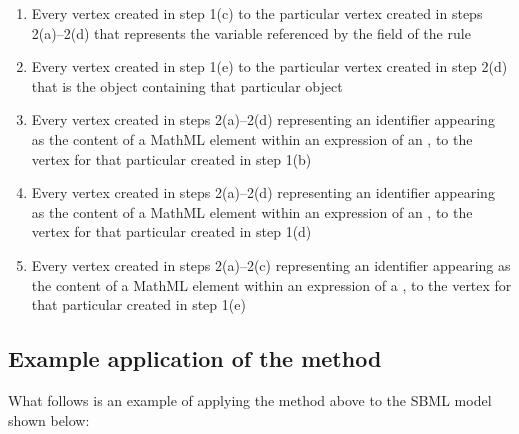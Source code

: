 \begin{enumerate}
\begin{enumerate}
  \item Every vertex created in step 1(c) to the particular vertex
    created in steps 2(a)--2(d) that represents the variable
    referenced by the  field of the rule
    
  \item Every vertex created in step 1(e) to the particular vertex
    created in step 2(d) that is the \Reaction object containing
    that particular \KineticLaw object
    
  \item Every vertex created in steps 2(a)--2(d) representing an
    identifier appearing as the content of a MathML 
    element within an expression of an \AssignmentRule, to the
    vertex for that particular \AssignmentRule created in step 1(b)
    
  \item Every vertex created in steps 2(a)--2(d) representing an
    identifier appearing as the content of a MathML 
    element within an expression of an \AlgebraicRule, to the
    vertex for that particular \AlgebraicRule created in step 1(d)
    
  \item Every vertex created in steps 2(a)--2(c) representing an
    identifier appearing as the content of a MathML 
    element within an expression of a \KineticLaw, to the vertex
    for that particular \KineticLaw created in step 1(e)

  \end{enumerate}

\end{enumerate}


\subsection*{Example application of the method}

What follows is an example of applying the method above to the
SBML model shown below:


